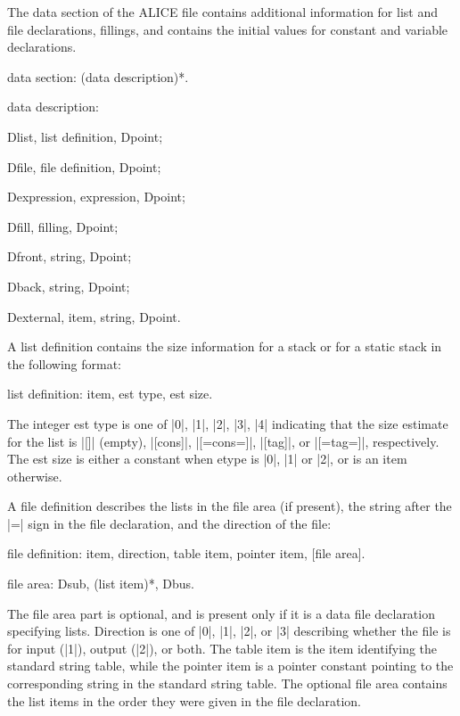 \documentclass[titlepage]{article}
\newcommand\I{\textsf{ALICE}}
\newenvironment{grammar}{%
\begin{list}{}{%
\setlength\leftmargin{18pt}%
\setlength\rightmargin{-5pt}%
\setlength\listparindent{20pt}%
\setlength\itemsep{1pt plus0.2ex}%
\setlength\parsep{0pt plus 2pt}%
\setlength\labelsep{-5pt}%
}\color{blue!90!black}\sf\mkoptions%
}{\end{list}}
\newcommand\g[1]{\textsf{\color{blue!90!black}#1}}
\begin{document}
The \g{data section} of the \I{} file contains additional information for 
list and file declarations, fillings, and contains the initial values for 
\g{constant} and \g{variable} declarations. 
\begin{grammar}
\item data section: (data description)*.
\item data description:

            Dlist, list definition, Dpoint;

            Dfile, file definition, Dpoint;

            Dexpression, expression, Dpoint;

            Dfill, filling, Dpoint;

            Dfront, string, Dpoint;

            Dback, string, Dpoint;

            Dexternal, item, string, Dpoint.
\end{grammar}
A \g{list definition} contains the size information for a stack or for a
static stack in the following format:
\begin{grammar}
\item list definition: item, est type, est size.
\end{grammar}
The integer \g{est type} is one of \pp|0|, \pp|1|, \pp|2|, \pp|3|, \pp|4|
indicating that the size estimate for the list is \pp|[]| (empty),
\pp|[cons]|, \pp|[=cons=]|, \pp|[tag]|, or \pp|[=tag=]|, respectively. The
\g{est size} is either a constant when \g{etype} is \pp|0|, \pp|1| or
\pp|2|, or is an \g{item} otherwise.

A \g{file definition} describes the lists in the file area (if present),
the string after the \pp|=| sign in the file declaration, and the direction
of the file:
\begin{grammar}
\item file definition: item, direction, table item, pointer item, [file
area].

\item file area: Dsub, (list item)*, Dbus.
\end{grammar}
The \g{file area} part is optional, and is present only if it is a data file
declaration specifying lists. \g{Direction} is one of \pp|0|, \pp|1|,
\pp|2|, or \pp|3| describing whether the file is for input (\pp|1|), output
(\pp|2|), or both. The \g{table item} is the item identifying the standard
string table, while the \g{pointer item} is a pointer constant pointing to the
corresponding string in the standard string table. The optional \g{file
area} contains the list items in the order they were given in the file
declaration.
\end{document}
